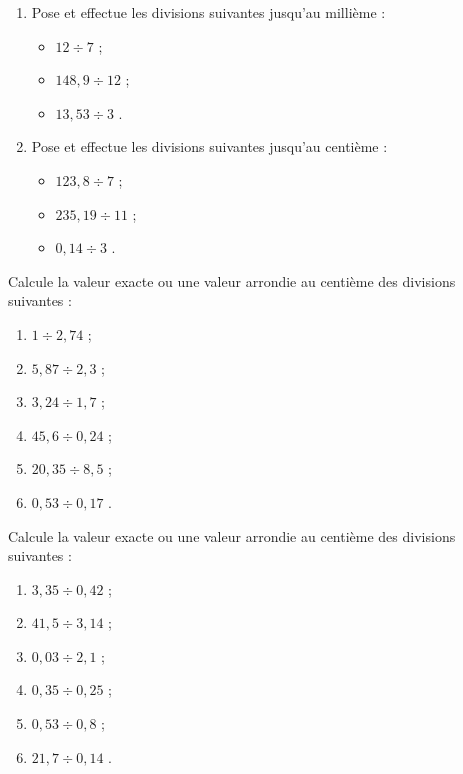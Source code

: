 \begin{exercice}
\vspace{-1em}
\begin{enumerate} 
 \item Pose et effectue les divisions suivantes jusqu'au millième :
 \begin{itemize}
  \item $12 \div 7$ \dotfill ; 
  
  \item $148,9 \div 12$ \dotfill ; 
  
  \item $13,53 \div 3$ \dotfill. 
  \end{itemize}
 \item Pose et effectue les divisions suivantes jusqu'au centième :
  \begin{itemize}
  \item $123,8 \div 7$ \dotfill ; 
  
  \item $235,19 \div 11$ \dotfill ; 
  
  \item $0,14 \div 3$ \dotfill. 
  \end{itemize}
 \end{enumerate}
\end{exercice}
\begin{exercice} 
Calcule la valeur exacte ou une valeur arrondie au centième des divisions suivantes :
\begin{enumerate} 
 \item $1 \div 2,74$ \dotfill ; 
 \item $5,87 \div 2,3$ \dotfill ; 
 \item $3,24 \div 1,7$ \dotfill ; 
 \item $45,6 \div 0,24$ \dotfill ; 
 \item $20,35 \div 8,5$ \dotfill ; 
 \item $0,53 \div 0,17$ \dotfill. 
 \end{enumerate}
\end{exercice}
\begin{exercice} 
Calcule la valeur exacte ou une valeur arrondie au centième des divisions suivantes :
\begin{enumerate} 
 \item $3,35 \div 0,42$ \dotfill ; 
 \item $41,5 \div 3,14$ \dotfill ; 
 \item $ 0,03 \div 2,1$ \dotfill ; 
 \item $0,35 \div 0,25$ \dotfill ; 
 \item $0,53 \div 0,8$ \dotfill ; 
 \item $21,7 \div 0,14$ \dotfill. 
 \end{enumerate}
\end{exercice}
